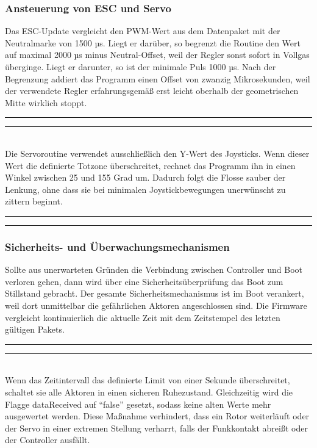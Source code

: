 \documentclass[a4paper,12pt]{article}
\begin{document}
\subsubsection{Ansteuerung von ESC und Servo}
Das ESC-Update vergleicht den PWM-Wert aus dem Datenpaket mit der Neutralmarke von 1500 µs. Liegt er darüber, so begrenzt die Routine den Wert auf maximal 2000 µs minus Neutral-Offset, weil der Regler sonst sofort in Vollgas überginge. Liegt er darunter, so ist der minimale Puls 1000 µs. Nach der Begrenzung addiert das Programm einen Offset von zwanzig Mikrosekunden, weil der verwendete Regler erfahrungsgemäß erst leicht oberhalb der geometrischen Mitte wirklich stoppt.
\newline\noindent\rule{\linewidth}{0.4pt}  %

\noindent\rule{\linewidth}{0.4pt}\\[0.5em]  %
Die Servoroutine verwendet ausschließlich den Y-Wert des Joysticks. Wenn dieser Wert die definierte Totzone überschreitet, rechnet das Programm ihn in einen Winkel zwischen 25 und 155 Grad um. Dadurch folgt die Flosse sauber der Lenkung, ohne dass sie bei minimalen Joystickbewegungen unerwünscht zu zittern beginnt.
\newline\noindent\rule{\linewidth}{0.4pt}  %

\noindent\rule{\linewidth}{0.4pt}  %
\subsubsection*{Sicherheits- und Überwachungsmechanismen}
Sollte aus unerwarteten Gründen die Verbindung zwischen Controller und Boot verloren gehen, dann wird über eine Sicherheitsüberprüfung das Boot zum Stillstand gebracht. Der gesamte Sicherheitsmechanismus ist im Boot verankert, weil dort unmittelbar die gefährlichen Aktoren angeschlossen sind. Die Firmware vergleicht kontinuierlich die aktuelle Zeit mit dem Zeitstempel des letzten gültigen Pakets. 
\newline\noindent\rule{\linewidth}{0.4pt}  %

\noindent\rule{\linewidth}{0.4pt}\\[0.5em]  %
Wenn das Zeitintervall das definierte Limit von einer Sekunde überschreitet, schaltet sie alle Aktoren in einen sicheren Ruhezustand. Gleichzeitig wird die Flagge dataReceived auf \enquote{false} gesetzt, sodass keine alten Werte mehr ausgewertet werden. Diese Maßnahme verhindert, dass ein Rotor weiterläuft oder der Servo in einer extremen Stellung verharrt, falls der Funkkontakt abreißt oder der Controller ausfällt.
\end{document}
